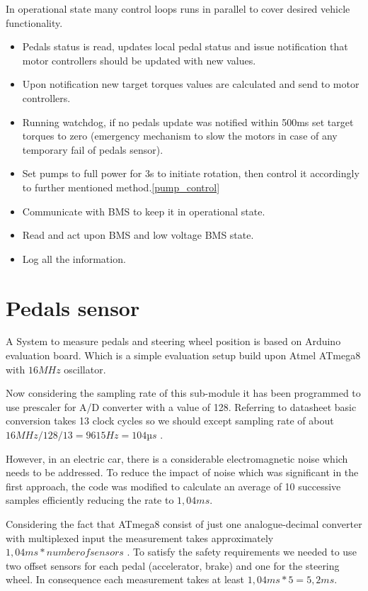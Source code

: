 In operational state many control loops runs in parallel to cover desired vehicle functionality.
\begin{itemize}
    \item Pedals status is read, updates local pedal status and issue notification that motor controllers should be updated with new values. 
    \item Upon notification new target torques values are calculated and send to motor controllers.
    \item Running watchdog, if no pedals update was notified within 500ms set target torques to zero (emergency mechanism to slow the motors in case of any temporary fail of pedals sensor).
    \item Set pumps to full power for 3s to initiate rotation, then control it accordingly to further mentioned method.\ref{pump_control}
    \item Communicate with BMS to keep it in operational state.
    \item Read and act upon BMS and low voltage BMS state.
    \item Log all the information.
\end{itemize}


\section{Pedals sensor}
A System to measure pedals and steering wheel position is based on Arduino evaluation board. Which is a simple evaluation setup build upon Atmel ATmega8 with $16MHz$ oscillator.

Now considering the sampling rate of this sub-module it has been programmed to use prescaler for A/D converter with a value of 128. Referring to datasheet basic conversion takes 13 clock cycles so we should except sampling rate of about $16MHz/128/13 = 9615Hz = 104µs$ \cite{Atmega8}.

However, in an electric car, there is a considerable electromagnetic noise which needs to be addressed. To reduce the impact of noise which was significant in the first approach, the code was modified to calculate an average of 10 successive samples efficiently reducing the rate to $1,04ms$.

Considering the fact that ATmega8 consist of just one analogue-decimal converter with multiplexed input the measurement takes approximately $1,04ms * number of sensors$ \cite{Atmega8}.
To satisfy the safety requirements we needed to use two offset sensors for each pedal (accelerator, brake) and one for the steering wheel. In consequence each measurement takes at least $1,04ms * 5 = 5,2ms$.

